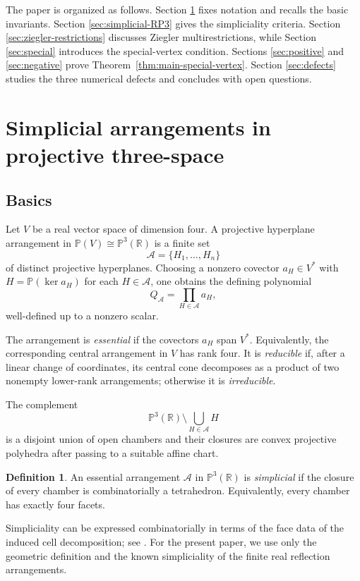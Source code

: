 \documentclass[11pt]{article}
\theoremstyle{definition}
\newtheorem{definition}[theorem]{Definition}
\theoremstyle{remark}
\newcommand{\PP}{\mathbb P}
\newcommand{\RR}{\mathbb R}
\newcommand{\cA}{\mathcal A}
\begin{document}
The paper is organized as follows.  Section \ref{sec:preliminaries}
fixes notation and recalls the basic invariants.  Section
\ref{sec:simplicial-RP3} gives the simpliciality criteria.  Section
\ref{sec:ziegler-restrictions} discusses Ziegler multirestrictions, while
Section \ref{sec:special} introduces the special-vertex condition.
Sections \ref{sec:positive} and \ref{sec:negative} prove
Theorem~\ref{thm:main-special-vertex}.  Section \ref{sec:defects}
studies the three numerical defects and concludes with open questions.

\section{Simplicial arrangements in projective three-space}
\label{sec:preliminaries}
\subsection{Basics}

Let $V$ be a real vector space of dimension four.  A projective hyperplane
arrangement in $\PP(V)\cong\PP^3(\RR)$ is a finite set
\[
 \cA=\{H_1,\dots,H_n\}
\]
of distinct projective hyperplanes.  Choosing a nonzero covector
$a_H\in V^*$ with $H=\PP(\ker a_H)$ for each $H\in\cA$, one obtains the
defining polynomial
\[
 Q_{\cA}=\prod_{H\in\cA}a_H,
\]
well-defined up to a nonzero scalar.

The arrangement is \emph{essential} if the covectors $a_H$ span $V^*$.
Equivalently, the corresponding central arrangement in $V$ has rank four.
It is \emph{reducible} if, after a linear change of coordinates, its central
cone decomposes as a product of two nonempty lower-rank arrangements;
otherwise it is \emph{irreducible}.

The complement
\[
 \PP^3(\RR)\setminus\bigcup_{H\in\cA}H
\]
is a disjoint union of open chambers and their closures are convex projective
polyhedra after passing to a suitable affine chart.

\begin{definition}
An essential arrangement $\cA$ in $\PP^3(\RR)$ is \emph{simplicial} if the
closure of every chamber is combinatorially a tetrahedron.  Equivalently,
every chamber has exactly four facets.
\end{definition}

Simpliciality can be expressed combinatorially in terms of the face data of
the induced cell decomposition; see \cite{CuntzGeis}.  For the present
paper, we use only the geometric definition and the known simpliciality of
the finite real reflection arrangements.
\end{document}
